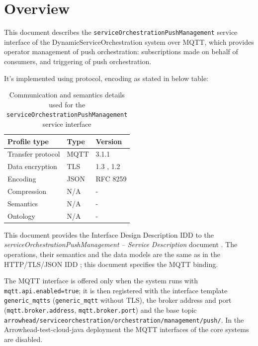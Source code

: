 \documentclass[a4paper]{arrowhead}
\begin{document}
\section{Overview}
\label{sec:overview}

This document describes the \texttt{service\allowbreak{}Orchestration\allowbreak{}Push\allowbreak{}Management} service interface of the DynamicServiceOrchestration system over MQTT, which provides operator management of push orchestration: subscriptions made on behalf of consumers, and triggering of push orchestration.

It's implemented using protocol, encoding as stated in below table:
\begin{table}[ht!]
  \centering
  \begin{tabular}{|l|l|l|}
    \hline
    \rowcolor{gray!33} Profile type & Type & Version \\ \hline
    Transfer protocol & MQTT & 3.1.1 \cite{mqtt311} \\ \hline
    Data encryption & TLS & 1.3 \cite{rfc8446}, 1.2 \cite{rfc5246} \\ \hline
    Encoding & JSON & RFC 8259 \cite{rfc8259} \\ \hline
    Compression & N/A & - \\ \hline
    Semantics & N/A & - \\ \hline
    Ontology & N/A & - \\ \hline
  \end{tabular}
  \caption{Communication and semantics details used for the \texttt{service\allowbreak{}Orchestration\allowbreak{}Push\allowbreak{}Management} service interface}
  \label{tab:comunication_semantics_profile}
\end{table}

This document provides the Interface Design Description IDD to the \textit{serviceOrchestrationPushManagement -- Service Description} document \cite{dso-serviceOrchestrationPushManagement-sd}.
The operations, their semantics and the data models are the same as in the HTTP/TLS/JSON IDD \cite{dso-serviceOrchestrationPushManagement-http-idd}; this document specifies the MQTT binding.

The MQTT interface is offered only when the system runs with \texttt{mqtt.api.enabled=true}; it is then registered with the interface template \texttt{generic\_\allowbreak{}mqtts} (\texttt{generic\_\allowbreak{}mqtt} without TLS), the broker address and port (\texttt{mqtt.\allowbreak{}broker.\allowbreak{}address}, \texttt{mqtt.\allowbreak{}broker.\allowbreak{}port}) and the base topic \texttt{arrowhead/\allowbreak{}serviceorchestration/\allowbreak{}orchestration/\allowbreak{}management/\allowbreak{}push/\allowbreak{}}. In the Arrowhead-test-cloud-java deployment the MQTT interfaces of the core systems are disabled.
\end{document}
